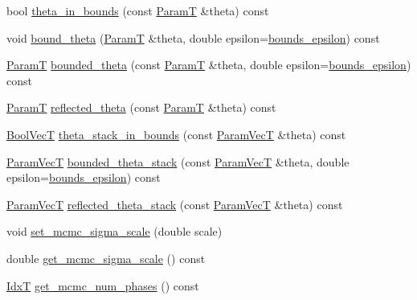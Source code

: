\begin{DoxyCompactItemize}
\item 
bool \hyperlink{classmappel_1_1PointEmitterModel_ad50dfc29b6e7167fb4caf8683353079d}{theta\+\_\+in\+\_\+bounds} (const \hyperlink{classmappel_1_1PointEmitterModel_a665ec6aea3aac139bb69a23c06d4b9a1}{ParamT} \&theta) const 
\item 
void \hyperlink{classmappel_1_1PointEmitterModel_a789dfcc9ea1df17a0282fca5705ade85}{bound\+\_\+theta} (\hyperlink{classmappel_1_1PointEmitterModel_a665ec6aea3aac139bb69a23c06d4b9a1}{ParamT} \&theta, double epsilon=\hyperlink{classmappel_1_1PointEmitterModel_ac987a119137b85a27704b1c40e3fab8c}{bounds\+\_\+epsilon}) const 
\item 
\hyperlink{classmappel_1_1PointEmitterModel_a665ec6aea3aac139bb69a23c06d4b9a1}{ParamT} \hyperlink{classmappel_1_1PointEmitterModel_ac342b21db8970dfa0b2809ffe5e73d06}{bounded\+\_\+theta} (const \hyperlink{classmappel_1_1PointEmitterModel_a665ec6aea3aac139bb69a23c06d4b9a1}{ParamT} \&theta, double epsilon=\hyperlink{classmappel_1_1PointEmitterModel_ac987a119137b85a27704b1c40e3fab8c}{bounds\+\_\+epsilon}) const 
\item 
\hyperlink{classmappel_1_1PointEmitterModel_a665ec6aea3aac139bb69a23c06d4b9a1}{ParamT} \hyperlink{classmappel_1_1PointEmitterModel_a7dd386776870462e8f20c646b6fed1e3}{reflected\+\_\+theta} (const \hyperlink{classmappel_1_1PointEmitterModel_a665ec6aea3aac139bb69a23c06d4b9a1}{ParamT} \&theta) const 
\item 
\hyperlink{namespacemappel_a167d761ecce3cafb6f98c00c16bdb523}{Bool\+VecT} \hyperlink{classmappel_1_1PointEmitterModel_a7b6a59b4bc796b440025cffb7a6159f8}{theta\+\_\+stack\+\_\+in\+\_\+bounds} (const \hyperlink{classmappel_1_1PointEmitterModel_add253b568d763f1513a810aac35de719}{Param\+VecT} \&theta) const 
\item 
\hyperlink{classmappel_1_1PointEmitterModel_add253b568d763f1513a810aac35de719}{Param\+VecT} \hyperlink{classmappel_1_1PointEmitterModel_a6671c06d391ae9a09dd5de78dcc636fe}{bounded\+\_\+theta\+\_\+stack} (const \hyperlink{classmappel_1_1PointEmitterModel_add253b568d763f1513a810aac35de719}{Param\+VecT} \&theta, double epsilon=\hyperlink{classmappel_1_1PointEmitterModel_ac987a119137b85a27704b1c40e3fab8c}{bounds\+\_\+epsilon}) const 
\item 
\hyperlink{classmappel_1_1PointEmitterModel_add253b568d763f1513a810aac35de719}{Param\+VecT} \hyperlink{classmappel_1_1PointEmitterModel_ae24c17017ff5e37e1dd9ea9a1aeefa7f}{reflected\+\_\+theta\+\_\+stack} (const \hyperlink{classmappel_1_1PointEmitterModel_add253b568d763f1513a810aac35de719}{Param\+VecT} \&theta) const 
\item 
void \hyperlink{classmappel_1_1MCMCAdaptorBase_aa6b8eea136bf1f34f0c50bf8d1937a58}{set\+\_\+mcmc\+\_\+sigma\+\_\+scale} (double scale)
\item 
double \hyperlink{classmappel_1_1MCMCAdaptorBase_a9de5ee52bbf5c8fd3c1e3bd00836801a}{get\+\_\+mcmc\+\_\+sigma\+\_\+scale} () const 
\item 
\hyperlink{namespacemappel_ab17ec0f30b61ece292439d7ece81d3a8}{IdxT} \hyperlink{classmappel_1_1MCMCAdaptorBase_adb9997f1dc774f3a169c61cdb730a85f}{get\+\_\+mcmc\+\_\+num\+\_\+phases} () const 
\end{DoxyCompactItemize}
